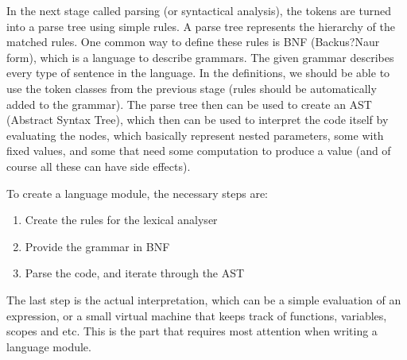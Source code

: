 In the next stage called parsing (or syntactical analysis), the tokens are turned into a parse tree using simple rules. A parse tree represents the hierarchy of the matched rules. One common way to define these rules is BNF (Backus?Naur form), which is a language to describe grammars. The given grammar describes every type of sentence in the language. In the definitions, we should be able to use the token classes from the previous stage (rules should be automatically added to the grammar). The parse tree then can be used to create an AST (Abstract Syntax Tree), which then can be used to interpret the code itself by evaluating the nodes, which basically represent nested parameters, some with fixed values, and some that need some computation to produce a value (and of course all these can have side effects).

To create a language module, the necessary steps are:
\begin{enumerate}
\item Create the rules for the lexical analyser
\item Provide the grammar in BNF
\item Parse the code, and iterate through the AST
\end{enumerate}
The last step is the actual interpretation, which can be a simple evaluation of an expression, or a small virtual machine that keeps track of functions, variables, scopes and etc. This is the part that requires most attention when writing a language module.

